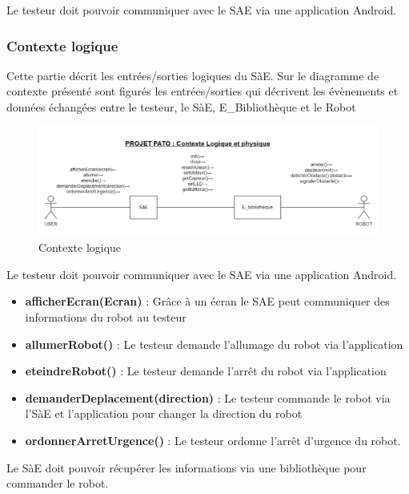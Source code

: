 Le testeur doit pouvoir communiquer avec le SAE via une application Android.

\subsubsection{Contexte logique}

Cette partie décrit les entrées/sorties logiques du SàE. Sur le diagramme de contexte présenté sont figurés les entrées/sorties qui décrivent les évènements et données échangées entre le testeur, le SàE, E\_Bibliothèque et le Robot

\begin{figure}[H]
    \center
    \includegraphics[scale=0.25]{data/contexte_log_phy.png}
    \caption{Contexte logique}
    \label{fig:contexte}
\end{figure}

Le testeur doit pouvoir communiquer avec le SAE via une application Android.

\begin{itemize}
    \item \textbf{afficherEcran(Ecran)} : Grâce à un écran le SAE peut communiquer des informations du robot au testeur
    \item \textbf{allumerRobot()} : Le testeur demande l'allumage du robot via l'application
    \item \textbf{eteindreRobot()} : Le testeur demande l'arrêt du robot via l'application
    \item \textbf{demanderDeplacement(direction)} : Le testeur commande le robot via l'SàE et l'application pour changer la direction du robot
    \item \textbf{ordonnerArretUrgence()} : Le testeur ordonne l'arrêt d'urgence du robot.
\end{itemize}

Le SàE doit pouvoir récupérer les informations via une bibliothèque pour commander le robot.

